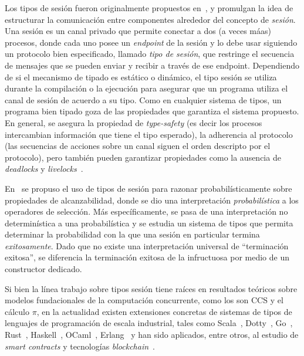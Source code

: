 Los tipos de sesión fueron originalmente propuestos en~\cite {Honda93}, y
promulgan la idea de estructurar la comunicación entre componentes alrededor
del concepto de {\em sesión}. Una {sesión} es un canal privado que permite
conectar a dos (a veces máas) procesos, donde cada uno posee un
\emph{endpoint} de la sesión y lo debe usar siguiendo un protocolo bien
especificado, llamado \emph{tipo de sesión}, que restringe el secuencia de
mensajes que se pueden enviar y recibir a través de ese endpoint. Dependiendo
de si el mecanismo de tipado es estático o dinámico, el tipo sesión se utiliza
durante la compilación o la ejecución para asegurar que un programa utiliza el
canal de sesión de acuerdo a su tipo. Como en cualquier sistema de tipos, un
programa bien tipado goza de las propiedades que garantiza el sistema
propuesto. En general, se asegura la propiedad de  {\em type-safety} (es decir
los procesos intercambian información que tiene el tipo esperado), la
adherencia al protocolo (las secuencias de acciones sobre un canal siguen el
orden descripto por el protocolo), pero también pueden garantizar propiedades
como la ausencia de {\em deadlocks} y {\em livelocks}~\cite{HuttelEtAl16}.

En~\cite{DBLP:conf/concur/InversoMPTT20} se propuso el uso de tipos de sesión
para razonar probabilísticamente sobre propiedades de alcanzabilidad, donde
se dio una interpretación \emph{probabilística} a los operadores de
selección. Más específicamente, se pasa de una interpretación no
determinística a una probabilística y se estudia un sistema de tipos que
permita determinar la probabilidad con la que una sesión en particular
termina \emph{exitosamente}. Dado que no existe una interpretación universal
de ``terminación exitosa'', se diferencia la terminación exitosa de la
infructuosa por medio de un {constructor dedicado}.

Si bien la línea trabajo sobre tipos sesión tiene raíces en resultados
teóricos sobre modelos fundacionales de la computación concurrente, como
los son CCS y el cálculo $\pi$, en la actualidad existen extensiones
concretas de sistemas de tipos de lenguajes de programación de escala
industrial, tales como Scala~\cite{DBLP:conf/pldi/ScalasYB19},
Dotty~\cite{DBLP:conf/pldi/ScalasYB19},
Go~\cite{DBLP:conf/icse/LangeNTY18,DBLP:conf/icse/LangeNTY18},
Rust~\cite{DBLP:journals/corr/abs-1909-05970,DBLP:conf/coordination/LagaillardieNY20},
Haskell~\cite{orchard2017session,DBLP:conf/haskell/LindleyM16},
OCaml~\cite{DBLP:journals/jfp/Padovani17,DBLP:conf/coordination/LagaillardieNY20,DBLP:conf/ecoop/ImaiNYY19},
Erlang~\cite{fowler2016erlang} y han sido aplicados, entre otros, al estudio de
{\em smart contracts} y tecnologías {\em
blockchain}~\cite{10.1145/3417516,DBLP:journals/corr/abs-1902-06056}. 

